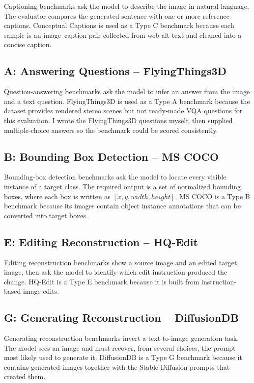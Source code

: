 \documentclass[11pt,a4paper]{article}
\begin{document}
Captioning benchmarks ask the model to describe the image in natural
language. The evaluator compares the generated sentence with one or more
reference captions. Conceptual Captions is used as a Type C benchmark because
each sample is an image--caption pair collected from web alt-text and cleaned
into a concise caption.

\subsection*{A: Answering Questions -- FlyingThings3D}

Question-answering benchmarks ask the model to infer an answer from the image
and a text question. FlyingThings3D is used as a Type A benchmark because the
dataset provides rendered stereo scenes but not ready-made VQA questions for
this evaluation. I wrote the FlyingThings3D questions myself, then supplied
multiple-choice answers so the benchmark could be scored consistently.

\subsection*{B: Bounding Box Detection -- MS COCO}

Bounding-box detection benchmarks ask the model to locate every visible
instance of a target class. The required output is a set of normalized
bounding boxes, where each box is written as \([x, y, width, height]\). MS
COCO is a Type B benchmark because its images contain object instance
annotations that can be converted into target boxes.

\subsection*{E: Editing Reconstruction -- HQ-Edit}

Editing reconstruction benchmarks show a source image and an edited target
image, then ask the model to identify which edit instruction produced the
change. HQ-Edit is a Type E benchmark because it is built from
instruction-based image edits.

\subsection*{G: Generating Reconstruction -- DiffusionDB}

Generating reconstruction benchmarks invert a text-to-image generation task.
The model sees an image and must recover, from several choices, the prompt
most likely used to generate it. DiffusionDB is a Type G benchmark because it
contains generated images together with the Stable Diffusion prompts that
created them.
\end{document}
